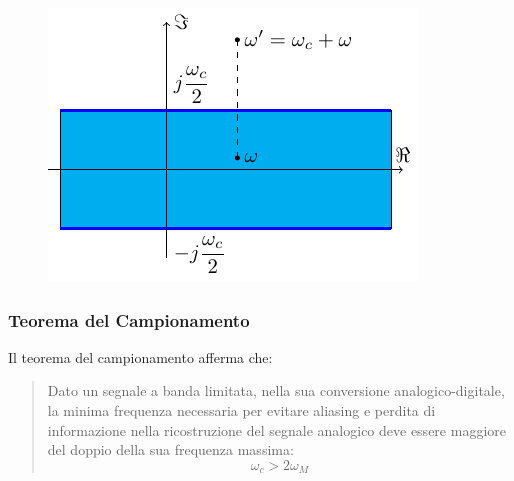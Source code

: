 \documentclass{article}
\numberwithin{equation}{subsection}
\begin{document}
\begin{figure}[H]%
    \centering
    \includegraphics{campionamento-2.pdf}%
\end{figure}

\subsubsection{Teorema del Campionamento}

Il teorema del campionamento afferma che:
\begin{quotation}
    Dato un segnale a banda limitata, nella sua conversione analogico-digitale, la minima frequenza necessaria per evitare aliasing e perdita di informazione nella 
    ricostruzione del segnale analogico deve essere maggiore del doppio della sua frequenza massima:
    \begin{equation}
        \omega_c>2\omega_M
    \end{equation}
\end{quotation}
\end{document}
